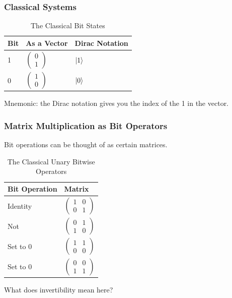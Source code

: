 \documentclass{beamer}
\begin{document}
\begin{frame}
\frametitle{Classical Systems}
\begin{table}
\begin{tabular}{l l l}
\toprule
\textbf{Bit} & \textbf{As a Vector} & \textbf{Dirac Notation}\\
\midrule
1 & $\begin{pmatrix}0 \\ 1\end{pmatrix}$ & $\ket{1}$ \\
0 & $\begin{pmatrix}1 \\ 0\end{pmatrix}$ & $\ket{0}$ \\
\bottomrule
\end{tabular}
\caption{The Classical Bit States}
\end{table}

Mnemonic: the Dirac notation gives you the index of the 1 in the vector.
\end{frame}

\begin{frame}
\frametitle{Matrix Multiplication as Bit Operators}
Bit operations can be thought of
as certain matrices.

\begin{table}
\begin{tabular}{l l}
\toprule
\textbf{Bit Operation} & \textbf{Matrix}\\
\midrule
Identity & $\begin{pmatrix}1 & 0 \\ 0 & 1\end{pmatrix}$ \\
Not & $\begin{pmatrix}0 & 1 \\ 1 & 0\end{pmatrix}$\\
Set to 0 & $\begin{pmatrix}1 & 1 \\ 0 & 0\end{pmatrix}$\\
Set to 0 & $\begin{pmatrix}0 & 0 \\ 1 & 1\end{pmatrix}$\\
\bottomrule
\end{tabular}
\caption{The Classical Unary Bitwise Operators}
\end{table}

What does invertibility mean here?

\end{frame}
\end{document}
